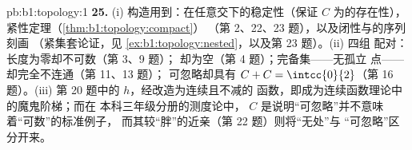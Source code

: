 \begin{solution}{pb:b1:topology:1}
\textbf{25.} (i) 构造用到：在任意交下的稳定性（保证
$C$ 为的存在性），
紧性定理（\cref{thm:b1:topology:compact}）
（第 2、22、23 题），以及闭性与的序列刻画
（紧集套论证，见
\cref{ex:b1:topology:nested}，以及第 23 题）。(ii) 四组
配对：长度为零却不可数（第 3、9 题）；
却为空（第 4 题）；完备集——无孤立
点——却完全不连通（第 11、13 题）；
可忽略却具有 $C + C = \intcc{0}{2}$（第 16 题）。(iii)
第 20 题中的 $h$，经改造为连续且不减的
函数，即成为连续函数理论中的魔鬼阶梯；而在
本科三年级分册的测度论中，
$C$ 是说明“可忽略”并不意味着“可数”的标准例子，
而其较“胖”的近亲（第 22 题）则将“无处”与
“可忽略”区分开来。
\end{solution}
